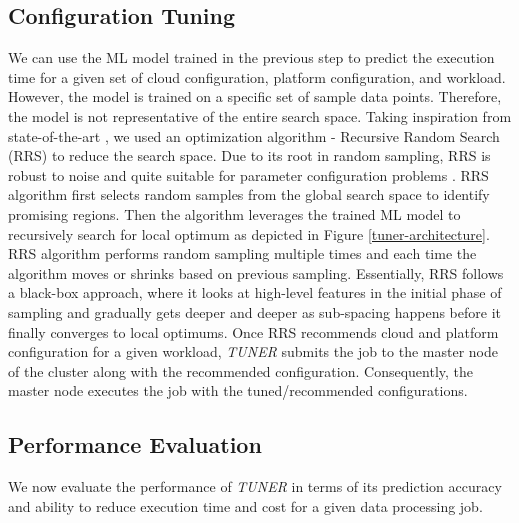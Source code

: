 \documentclass[3p]{elsarticle}
\begin{document}
\subsection{Configuration Tuning} We can use the ML model trained in the previous step to predict the execution time for a given set of cloud configuration, platform configuration, and workload. However, the model is trained on a specific set of sample data points. Therefore, the model is not representative of the entire search space. Taking inspiration from state-of-the-art \cite{herodotou2011profiling, herodotou2011no, herodotou2011starfish}, we used an optimization algorithm - Recursive Random Search (RRS) to reduce the search space. Due to its root in random sampling, RRS is robust to noise and quite suitable for parameter configuration problems \cite{herodotou2011profiling, herodotou2011no, herodotou2011starfish}. RRS algorithm first selects random samples from the global search space to identify promising regions. Then the algorithm leverages the trained ML model to recursively search for local optimum as depicted in Figure \ref{tuner-architecture}. RRS algorithm performs random sampling multiple times and each time the algorithm moves or shrinks based on previous sampling. Essentially, RRS follows a black-box approach, where it looks at high-level features in the initial phase of sampling and gradually gets deeper and deeper as sub-spacing happens before it finally converges to local optimums.  Once RRS recommends cloud and platform configuration for a given workload, \textit{TUNER} submits the job to the master node of the cluster along with the recommended configuration. Consequently, the master node executes the job with the tuned/recommended configurations. 

\subsection{Performance Evaluation} We now evaluate the performance of \textit{TUNER} in terms of its prediction accuracy and ability to reduce execution time and cost for a given data processing job. 
\end{document}
